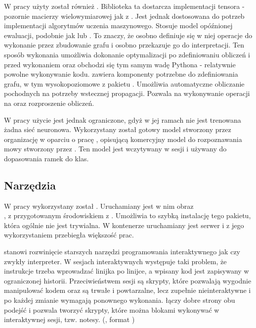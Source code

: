 W pracy użyty został również . Biblioteka ta dostarcza
implementacji tensora - pozornie macierzy wielowymiarowej jak z . Jest jednak
dostosowana do potrzeb implementacji algorytmów uczenia maszynowego. Stosuje model opóźnionej
ewaluacji, podobnie jak  lub . To znaczy, że
osobno definiuje się w niej operacje do wykonanie przez zbudowanie grafu i osobno przekazuje go do interpretacji.
Ten sposób wykonania umożliwia dokonanie optymalizacji po zdefiniowaniu obliczeń i przed wykonaniem oraz
obchodzi się tym samym wadę Pythona - relatywnie powolne wykonywanie kodu.
 zawiera komponenty potrzebne do zdefiniowania grafu, w tym wysokopoziomowe
z pakietu . Umożliwia automatyczne obliczanie pochodnych na potrzeby wstecznej propagacji.
Pozwala na wykonywanie operacji na  oraz rozproszenie obliczeń.

W pracy użycie  jest jednak ograniczone, gdyż w jej ramach nie jest trenowana żadna
sieć neuronowa. Wykorzystany został gotowy model stworzony przez organizację  w oparciu o
pracę \cite{deepSpeechScaling}, opisującą komercyjny model do rozpoznawania mowy stworzony
przez . Ten model jest wczytywany w sesji  i używany do dopasowania
ramek do klas.

\subsection{Narzędzia}

W pracy wykorzystany został . Uruchamiany jest w nim obraz \\ ,
z przygotowanym środowiskiem z . Umożliwia to szybką instalację tego pakietu, która ogólnie nie
jest trywialna. W kontenerze uruchamiany jest serwer  i z jego wykorzystaniem przebiegła większość prac.

 stanowi rozwinięcie starszych narzędzi programowania interaktywnego jak  czy zwykły  interpreter. W sesjach interaktywnych występuje taki problem, że instrukcje trzeba wprowadzać linijka po linijce, a wpisany kod jest zapisywany w ograniczonej historii. Przeciwieństwem sesji są skrypty, które pozwalają wygodnie manipulować
kodem oraz są trwałe i powtarzalne, lecz zupełnie nieinteraktywne i po każdej zmianie wymagają ponownego wykonania.
 łączy dobre strony obu podejść i pozwala tworzyć skrypty, które można blokami wykonywać
w interaktywnej sesji, tzw. notesy. (, format )

